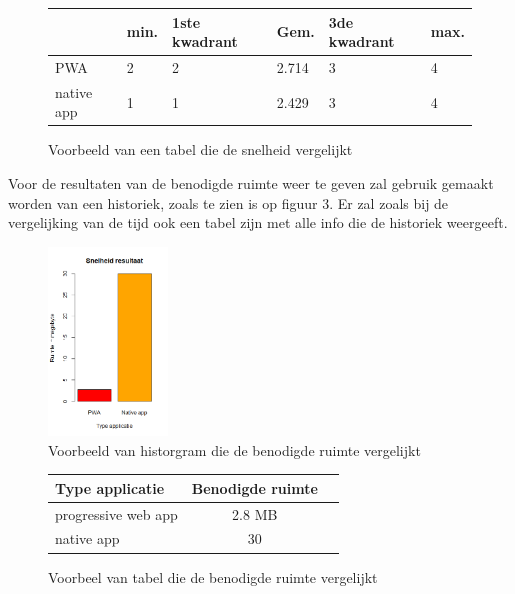 \begin{figure}[!h]
	\begin{tabularx}{\textwidth / 2}{|X|X|X|X|X|X|}
		\hline
		 & min. & 1ste kwadrant & Gem. & 3de kwadrant & max. \\
		\hline
		PWA & 2 & 2 & 2.714 & 3 & 4 \\
		\hline
		native app & 1 & 1 & 2.429 & 3 & 4 \\
		\hline
	\end{tabularx}
	\caption{Voorbeeld van een tabel die de snelheid vergelijkt}
\end{figure}


Voor de resultaten van de benodigde ruimte weer te geven zal gebruik gemaakt worden van een historiek, zoals te zien is op figuur 3. Er zal zoals bij de vergelijking van de tijd ook een tabel zijn met alle info die de historiek weergeeft.

\begin{figure}[!h]
	\includegraphics[width=120px]{Rplot_Ruimte_PWAvsNativeApp.png}\centering
	\caption{Voorbeeld van historgram die de benodigde ruimte vergelijkt}
\end{figure}


\begin{figure}[!h]
\begin{tabular}{ |p{10em}|c|c| }
	\hline
	Type applicatie & Benodigde ruimte \\
	\hline
	progressive web app & 2.8 MB \\
	\hline
	native app & 30 \\
	\hline
\end{tabular}
\caption{Voorbeel van tabel die de benodigde ruimte vergelijkt}
\end{figure}



